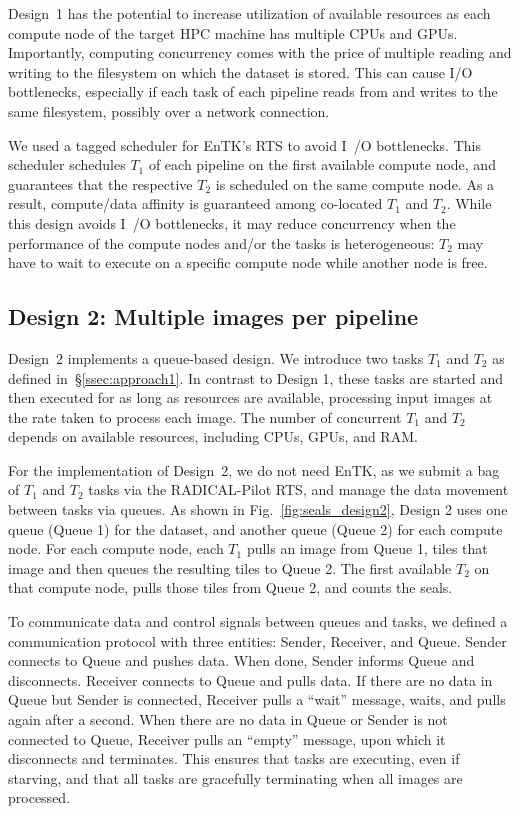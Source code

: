 Design~1 has the potential to increase utilization of available resources as
each compute node of the target HPC machine has multiple CPUs and GPUs.
Importantly, computing concurrency comes with the price of multiple reading
and writing to the filesystem on which the dataset is stored. This can cause
I/O bottlenecks, especially if each task of each pipeline reads from and
writes to the same filesystem, possibly over a network connection.

We used a tagged scheduler for EnTK's RTS to avoid I~/O bottlenecks. This
scheduler schedules $T_{1}$ of each pipeline on the first available compute
node, and guarantees that the respective $T_{2}$ is scheduled on the same
compute node. As a result, compute/data affinity is guaranteed among
co-located $T_{1}$ and $T_{2}$. While this design avoids I~/O bottlenecks, it
may reduce concurrency when the performance of the compute nodes and/or the
tasks is heterogeneous: $T_{2}$ may have to wait to execute on a specific
compute node while another node is free.


\subsection{Design 2: Multiple images per pipeline}\label{ssec:approach2}

Design~2 implements a queue-based design. We introduce two tasks $T_{1}$ and
$T_{2}$ as defined in~\S\ref{ssec:approach1}. In contrast to Design 1, these
tasks are started and then executed for as long as resources are
available, processing input images at the rate taken to process each image.
The number of concurrent $T_{1}$ and $T_{2}$ depends on available resources,
including CPUs, GPUs, and RAM.

For the implementation of Design~2, we do not need EnTK, as we submit a 
bag of $T_{1}$ and $T_{2}$ tasks via the RADICAL\nobreakdash-Pilot RTS, and 
manage the data movement between tasks via queues. As shown in 
Fig.~\ref{fig:seals_design2}, Design 2 uses one queue (Queue 1) for the 
dataset, and another queue (Queue 2) for each compute node. For each 
compute node, each $T_{1}$ pulls an image from Queue 1, tiles that image and 
then queues the resulting tiles to Queue 2. The first available $T_{2}$ on 
that compute node, pulls those tiles from Queue 2, and counts the seals.

To communicate data and control signals between queues and tasks, we defined
a communication protocol with three entities: Sender, Receiver, and Queue.
Sender connects to Queue and pushes data. When done, Sender informs Queue and
disconnects. Receiver connects to Queue and pulls data. If there are no data
in Queue but Sender is connected, Receiver pulls a ``wait'' message, waits,
and pulls again after a second. When there are no data in Queue or Sender is
not connected to Queue, Receiver pulls an ``empty'' message, upon which it
disconnects and terminates. This ensures that tasks are executing, even if
starving, and that all tasks are gracefully terminating when all images are
processed.

